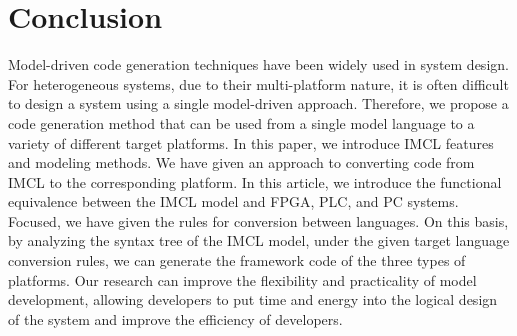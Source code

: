 \section{Conclusion}
Model-driven code generation techniques have been widely used in system design. For heterogeneous systems, due to their multi-platform nature, it is often difficult to design a system using a single model-driven approach. Therefore, we propose a code generation method that can be used from a single model language to a variety of different target platforms. In this paper, we introduce IMCL features and modeling methods. We have given an approach to converting code from IMCL to the corresponding platform. In this article, we introduce the functional equivalence between the IMCL model and FPGA, PLC, and PC systems. Focused, we have given the rules for conversion between languages. On this basis, by analyzing the syntax tree of the IMCL model, under the given target language conversion rules, we can generate the framework code of the three types of platforms. Our research can improve the flexibility and practicality of model development, allowing developers to put time and energy into the logical design of the system and improve the efficiency of developers. 